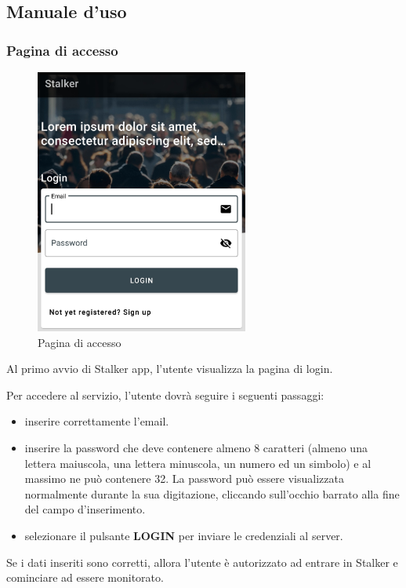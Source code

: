 \documentclass[../manuale-utente.tex]{subfiles}
\begin{document}
\subsection{Manuale d'uso}%
\label{sub:manuale_uso_mobile}

\subsubsection{Pagina di accesso}%
\label{sub:pagina_di_accesso}

\begin{figure}[H]
    \centering
    \includegraphics[width=70mm]{img/mobile-app/pagina-di-accesso.jpg}
    \caption{Pagina di accesso}%
    \label{fig:mobile_app_pagina_di_accesso}
\end{figure}

Al primo avvio di Stalker app, l'utente visualizza la pagina di login. 

Per accedere al servizio, l'utente dovrà seguire i seguenti passaggi:
\begin{itemize}
    \item inserire correttamente l'email.
    \item inserire la password che deve contenere almeno 8 caratteri (almeno una lettera maiuscola, una lettera minuscola, un numero ed un simbolo) e al massimo ne può contenere 32. La password può essere visualizzata normalmente durante la sua digitazione, cliccando sull'occhio barrato alla fine del campo d'inserimento.
    \item selezionare il pulsante \textbf{LOGIN} per inviare le credenziali al server.
\end{itemize} 

Se i dati inseriti sono corretti, allora l'utente è autorizzato ad entrare in Stalker e cominciare ad essere monitorato.
\end{document}
